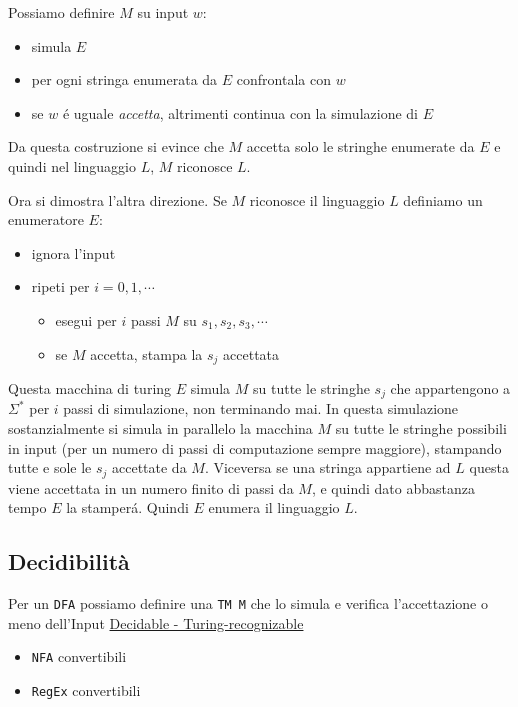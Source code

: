 \documentclass[
                        12pt, %
                        a4paper, %
                        oneside, %
                        headinclude,footinclude, %
                        BCOR5mm, %
                  ]{scrartcl}
\begin{document}
Possiamo definire \(M\) su input \(w\):
\begin{itemize}
\item simula \(E\)
\item per ogni stringa enumerata da \(E\) confrontala con \(w\)
\item se \(w\) é uguale \emph{accetta}, altrimenti continua con la simulazione di \(E\)
\end{itemize}

Da questa costruzione si evince che \(M\) accetta solo le stringhe enumerate da \(E\) e quindi nel linguaggio \(L\), \(M\) riconosce \(L\).

Ora si dimostra l'altra direzione. Se \(M\) riconosce il linguaggio \(L\) definiamo un enumeratore \(E\):
\begin{itemize}
\item ignora l'input
\item ripeti per \(i=0,1,\cdots\)
\begin{itemize}
\item esegui per \(i\) passi \(M\) su \(s_1,s_2,s_3,\cdots\)
\item se \(M\) accetta, stampa la \(s_j\) accettata
\end{itemize}
\end{itemize}

Questa macchina di turing \(E\) simula \(M\) su tutte le stringhe \(s_j\) che appartengono a \(\Sigma^*\) per \(i\) passi di simulazione, non terminando mai.
In questa simulazione sostanzialmente si simula in parallelo la macchina \(M\) su tutte le stringhe possibili in input (per un numero di passi di computazione sempre maggiore), stampando tutte e sole le \(s_j\) accettate da \(M\).
Viceversa se una stringa appartiene ad \(L\) questa viene accettata in un numero finito di passi da \(M\), e quindi dato abbastanza tempo \(E\) la stamperá. Quindi \(E\) enumera il linguaggio \(L\).

\subsection{Decidibilità}
\label{sec:org7282494}
Per un \texttt{DFA} possiamo definire una \texttt{TM M} che lo simula e verifica l'accettazione o meno dell'Input
\href{../media/img/decidable-recognizable.jpg}{Decidable - Turing-recognizable}
\begin{itemize}
\item \texttt{NFA} convertibili
\item \texttt{RegEx} convertibili
\end{itemize}
\end{document}
